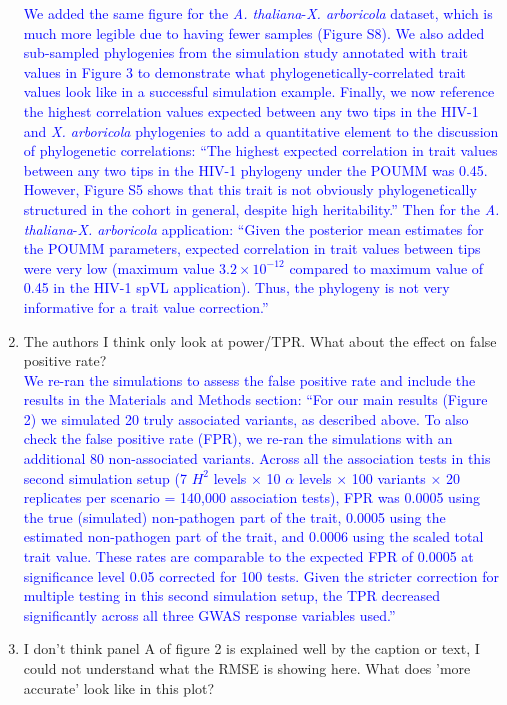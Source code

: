 \documentclass[11pt]{article}
\begin{document}
\begin{enumerate}
    \textcolor{blue}{We added the same figure for the \emph{A. thaliana}-\emph{X. arboricola} dataset, which is much more legible due to having fewer samples (Figure S8). We also added sub-sampled phylogenies from the simulation study annotated with trait values in Figure 3 to demonstrate what phylogenetically-correlated trait values look like in a successful simulation example. Finally, we now reference the highest correlation values expected between any two tips in the HIV-1 and \emph{X. arboricola} phylogenies to add a quantitative element to the discussion of phylogenetic correlations: ``The highest expected correlation in trait values between any two tips in the HIV-1 phylogeny under the POUMM was 0.45. However, Figure S5 shows that this trait is not obviously phylogenetically structured in the cohort in general, despite high heritability.'' Then for the \emph{A. thaliana}-\emph{X. arboricola} application: ``Given the posterior mean estimates for the POUMM parameters, expected correlation in trait values between tips were very low (maximum value $3.2 \times 10^{-12}$ compared to maximum value of 0.45 in the HIV-1 spVL application). Thus, the phylogeny is not very informative for a trait value correction.''}
    \item The authors I think only look at power/TPR. What about the effect on false positive rate? \\
    \textcolor{blue}{We re-ran the simulations to assess the false positive rate and include the results in the Materials and Methods section: ``For our main results (Figure 2) we simulated 20 truly associated variants, as described above. To also check the false positive rate (FPR), we re-ran the simulations with an additional 80 non-associated variants. Across all the association tests in this second simulation setup (7 $H^2$ levels × 10 $\alpha$ levels × 100 variants × 20 replicates per scenario = 140,000 association tests), FPR was 0.0005 using the true (simulated) non-pathogen part of the trait, 0.0005 using the estimated non-pathogen part of the trait, and 0.0006 using the scaled total trait value. These rates are comparable to the expected FPR of 0.0005 at significance level 0.05 corrected for 100 tests. Given the stricter correction for multiple testing in this second simulation setup, the TPR decreased significantly across all three GWAS response variables used.''}
    \item I don't think panel A of figure 2 is explained well by the caption or text, I could not understand what the RMSE is showing here. What does 'more accurate' look like in this plot? \\

\end{enumerate}
\end{document}
